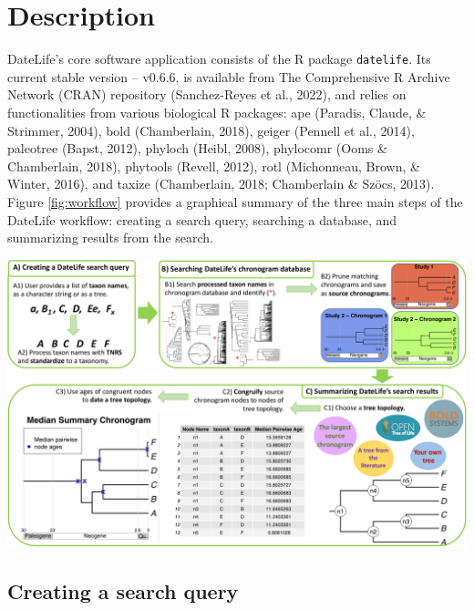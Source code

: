 \documentclass[english,man]{apa6}
\begin{document}
\hypertarget{description}{%
\section{Description}\label{description}}

DateLife's core software application consists of the R package \texttt{datelife}. Its current stable version -- v0.6.6, is available from The Comprehensive R Archive Network (CRAN) repository (Sanchez-Reyes et al., 2022), and relies on functionalities from various biological R packages:
ape (Paradis, Claude, \& Strimmer, 2004),
bold (Chamberlain, 2018),
geiger (Pennell et al., 2014),
paleotree (Bapst, 2012),
phyloch (Heibl, 2008),
phylocomr (Ooms \& Chamberlain, 2018),
phytools (Revell, 2012),
rotl (Michonneau, Brown, \& Winter, 2016), and
taxize (Chamberlain, 2018; Chamberlain \& Szöcs, 2013).
Figure \ref{fig:workflow} provides a graphical summary of the three main steps of the DateLife workflow: creating a search query, searching a database, and summarizing results from the search.

\begin{minipage}[t]{17.3cm}
\includegraphics{../figures/figure-workflow/figure1-new.pdf}
\label{fig:workflow}
\end{minipage}

\hypertarget{creating-a-search-query}{%
\subsection{Creating a search query}\label{creating-a-search-query}}
\end{document}
